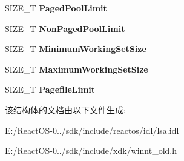 \begin{DoxyCompactItemize}
\mbox{\label{struct___q_u_o_t_a___l_i_m_i_t_s_a7d70130f7006fc29ac7690b550ab107e}} 
S\+I\+Z\+E\+\_\+T {\bfseries Paged\+Pool\+Limit}
\item 
\mbox{\label{struct___q_u_o_t_a___l_i_m_i_t_s_a8314bb3ceede645e86242b4b63cfd055}} 
S\+I\+Z\+E\+\_\+T {\bfseries Non\+Paged\+Pool\+Limit}
\item 
\mbox{\label{struct___q_u_o_t_a___l_i_m_i_t_s_aacb4daaafbbbec7f859fc5e831f46743}} 
S\+I\+Z\+E\+\_\+T {\bfseries Minimum\+Working\+Set\+Size}
\item 
\mbox{\label{struct___q_u_o_t_a___l_i_m_i_t_s_a718ec006ed984b06ad25459b96388d65}} 
S\+I\+Z\+E\+\_\+T {\bfseries Maximum\+Working\+Set\+Size}
\item 
\mbox{\label{struct___q_u_o_t_a___l_i_m_i_t_s_ab4942e14fd321f89d32c4a9c3be9ed79}} 
S\+I\+Z\+E\+\_\+T {\bfseries Pagefile\+Limit}
\end{DoxyCompactItemize}


该结构体的文档由以下文件生成\+:\begin{DoxyCompactItemize}
\item 
E\+:/\+React\+O\+S-\/0../sdk/include/reactos/idl/lsa.\+idl\item 
E\+:/\+React\+O\+S-\/0../sdk/include/xdk/winnt\+\_\+old.\+h\end{DoxyCompactItemize}
